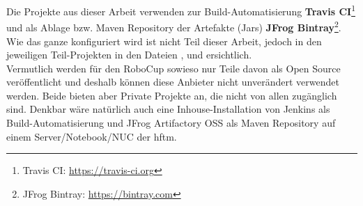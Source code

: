 Die Projekte aus dieser Arbeit verwenden zur Build-Automatisierung \textbf{Travis CI}\footnote{Travis CI: \url{https://travis-ci.org}} und als Ablage bzw. Maven Repository der Artefakte (Jars) \textbf{JFrog Bintray}\footnote{JFrog Bintray: \url{https://bintray.com}}. Wie das ganze konfiguriert wird ist nicht Teil dieser Arbeit, jedoch in den jeweiligen Teil-Projekten in den Dateien ,  und  ersichtlich. \\ Vermutlich werden für den RoboCup sowieso nur Teile davon als Open Source veröffentlicht und deshalb können diese Anbieter nicht unverändert verwendet werden. Beide bieten aber Private Projekte an, die nicht von allen zugänglich sind. Denkbar wäre natürlich auch eine Inhouse-Installation von Jenkins als Build-Automatisierung und JFrog Artifactory OSS als Maven Repository auf einem Server/Notebook/NUC der \acrshort{hftm}.

